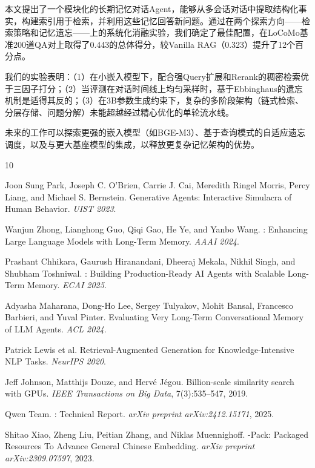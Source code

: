 \documentclass[11pt,a4paper]{ctexart}
\begin{document}
本文提出了一个模块化的长期记忆对话Agent，能够从多会话对话中提取结构化事实，构建索引用于检索，并利用这些记忆回答新问题。通过在两个探索方向——检索策略和记忆遗忘——上的系统化消融实验，我们确定了最佳配置，在LoCoMo基准200道QA对上取得了0.443的总体得分，较Vanilla RAG（0.323）提升了12个百分点。

我们的实验表明：（1）在小嵌入模型下，配合强Query扩展和Rerank的稠密检索优于三因子打分；（2）当评测在对话时间线上均匀采样时，基于Ebbinghaus的遗忘机制是适得其反的；（3）在3B参数生成约束下，复杂的多阶段架构（链式检索、分层存储、问题分解）未能超越经过精心优化的单轮流水线。

未来的工作可以探索更强的嵌入模型（如BGE-M3）、基于查询模式的自适应遗忘调度，以及与更大基座模型的集成，以释放更复杂记忆架构的优势。


\begin{thebibliography}{10}

Joon Sung Park, Joseph C. O'Brien, Carrie J. Cai, Meredith Ringel Morris, Percy Liang, and Michael S. Bernstein.
\newblock Generative Agents: Interactive Simulacra of Human Behavior.
\newblock \emph{UIST 2023}.

Wanjun Zhong, Lianghong Guo, Qiqi Gao, He Ye, and Yanbo Wang.
: Enhancing Large Language Models with Long-Term Memory.
\newblock \emph{AAAI 2024}.

Prashant Chhikara, Gaurush Hiranandani, Dheeraj Mekala, Nikhil Singh, and Shubham Toshniwal.
: Building Production-Ready {AI} Agents with Scalable Long-Term Memory.
\newblock \emph{ECAI 2025}.

Adyasha Maharana, Dong-Ho Lee, Sergey Tulyakov, Mohit Bansal, Francesco Barbieri, and Yuval Pinter.
\newblock Evaluating Very Long-Term Conversational Memory of {LLM} Agents.
\newblock \emph{ACL 2024}.

Patrick Lewis et al.
\newblock Retrieval-Augmented Generation for Knowledge-Intensive {NLP} Tasks.
\newblock \emph{NeurIPS 2020}.

Jeff Johnson, Matthijs Douze, and Herv\'{e} J\'{e}gou.
\newblock Billion-scale similarity search with {GPUs}.
\newblock \emph{IEEE Transactions on Big Data}, 7(3):535--547, 2019.

Qwen Team.
: Technical Report.
\newblock \emph{arXiv preprint arXiv:2412.15171}, 2025.

Shitao Xiao, Zheng Liu, Peitian Zhang, and Niklas Muennighoff.
-{P}ack: Packaged Resources To Advance General {C}hinese Embedding.
\newblock \emph{arXiv preprint arXiv:2309.07597}, 2023.

\end{thebibliography}
\end{document}
